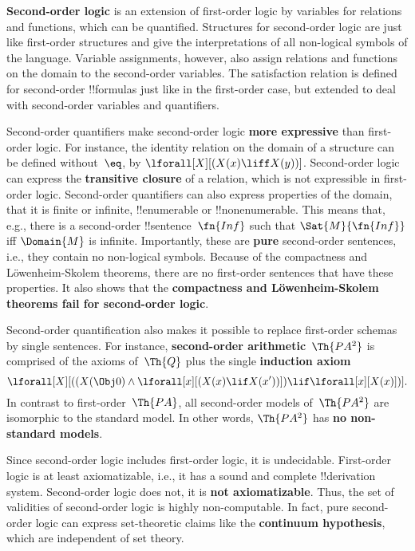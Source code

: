 \textbf{Second-order logic} is an extension of first-order logic by
variables for relations and functions, which can be
quantified. Structures for second-order logic are just like
first-order structures and give the interpretations of all non-logical
symbols of the language.  Variable assignments, however, also assign
relations and functions on the domain to the second-order
variables. The satisfaction relation is defined for second-order
!!{formula}s just like in the first-order case, but extended to deal
with second-order variables and quantifiers.

Second-order quantifiers make second-order logic \textbf{more
  expressive} than first-order logic.  For instance, the identity
relation on the domain of a structure can be defined without~$\eq$, by
$\lforall[X][(X(x) \liff X(y))]$. Second-order logic can express the
\textbf{transitive closure} of a relation, which is not expressible in
first-order logic.  Second-order quantifiers can also express
properties of the domain, that it is finite or infinite,
!!{enumerable} or !!{nonenumerable}. This means that, e.g., there is a
second-order !!{sentence}~$\fn{Inf}$ such that $\Sat{M}{\fn{Inf}}$ iff
$\Domain{M}$ is infinite. Importantly, these are \textbf{pure}
second-order sentences, i.e., they contain no non-logical
symbols. Because of the compactness and L\"owenheim-Skolem theorems,
there are no first-order sentences that have these properties.  It
also shows that the \textbf{compactness and L\"owenheim-Skolem
  theorems fail for second-order logic}.

Second-order quantification also makes it possible to replace
first-order schemas by single sentences. For instance,
\textbf{second-order arithmetic}~$\Th{PA^2}$ is comprised of the
axioms of~$\Th{Q}$ plus the single \textbf{induction axiom}
\[
\lforall[X][((X(\Obj 0) \land \lforall[x][(X(x) \lif X(x'))]) \lif
  \lforall[x][X(x)])].
\]
In contrast to first-order~$\Th{PA}$, all second-order models
of~$\Th{PA^2}$ are isomorphic to the standard model. In other words,
$\Th{PA^2}$ has \textbf{no non-standard models}. 

Since second-order logic includes first-order logic, it is
undecidable. First-order logic is at least axiomatizable, i.e., it has
a sound and complete !!{derivation} system. Second-order logic does not, it is
\textbf{not axiomatizable}. Thus, the set of validities of
second-order logic is highly non-computable. In fact, pure second-order
logic can express set-theoretic claims like the \textbf{continuum
  hypothesis}, which are independent of set theory.

